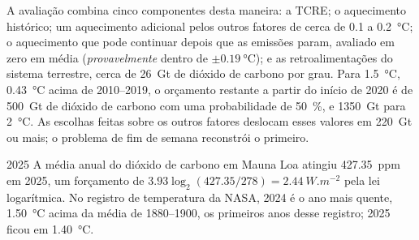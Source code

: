 A avaliação combina cinco componentes desta maneira: a TCRE; o aquecimento histórico; um
aquecimento adicional pelos outros fatores de cerca de 0.1 a \qty{0.2}{\celsius}; o aquecimento que pode
continuar depois que as emissões param, avaliado em zero em média (\emph{provavelmente} dentro de $\pm
\qty{0.19}{\celsius}$); e as retroalimentações do sistema terrestre, cerca de \qty{26}{Gt} de dióxido de carbono por
grau. Para \qty{1.5}{\celsius}, \qty{0.43}{\celsius} acima de 2010--2019, o orçamento restante a partir do
início de 2020 é de \qty{500}{Gt} de dióxido de carbono com uma probabilidade de \qty{50}{\percent}, e
\qty{1350}{Gt} para \qty{2}{\celsius}. As escolhas feitas sobre os outros fatores deslocam esses valores em
\qty{220}{Gt} ou mais; o problema de fim de semana reconstrói o primeiro.

\begin{dated}{2025}
A média anual do dióxido de carbono em Mauna Loa atingiu \qty{427.35}{ppm} em 2025, um forçamento de
$3.93\log_2(427.35/278) = \qty{2.44}{W.m^{-2}}$ pela lei logarítmica. No registro de temperatura
da NASA, 2024 é o ano mais quente, \qty{1.50}{\celsius} acima da média de 1880--1900, os primeiros
anos desse registro; 2025 ficou em \qty{1.40}{\celsius}.
\end{dated}

